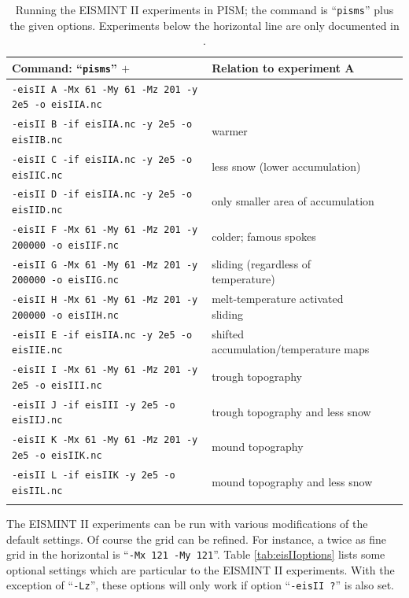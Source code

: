 \documentclass[11pt,final]{amsart}
\renewcommand{\t}[1]{\texttt{#1}}
\begin{document}
\begin{table}[ht]
\caption{Running the EISMINT II experiments in PISM; the command is ``\t{pisms}'' plus the given options.  Experiments below the horizontal line are only documented in \cite{EISIIdescribe}.}\label{tab:eisII}
\small
\begin{tabular}{@{}llll}\hline
\textbf{Command: ``\t{pisms}'' $+$} & \textbf{Relation to experiment A} \\ \hline
\verb|-eisII A -Mx 61 -My 61 -Mz 201 -y 2e5 -o eisIIA.nc| & \\
\verb|-eisII B -if eisIIA.nc -y 2e5 -o eisIIB.nc| & warmer \\
\verb|-eisII C -if eisIIA.nc -y 2e5 -o eisIIC.nc| & less snow (lower accumulation)\\
\verb|-eisII D -if eisIIA.nc -y 2e5 -o eisIID.nc| & only smaller area of accumulation \\
\verb|-eisII F -Mx 61 -My 61 -Mz 201 -y 200000 -o eisIIF.nc| & colder; famous spokes \cite{BBL} \\
\verb|-eisII G -Mx 61 -My 61 -Mz 201 -y 200000 -o eisIIG.nc| & sliding (regardless of temperature) \\
\verb|-eisII H -Mx 61 -My 61 -Mz 201 -y 200000 -o eisIIH.nc| & melt-temperature activated sliding \\ \hline
\verb|-eisII E -if eisIIA.nc -y 2e5 -o eisIIE.nc| & shifted accumulation/temperature maps \\
\verb|-eisII I -Mx 61 -My 61 -Mz 201 -y 2e5 -o eisIII.nc| & trough topography \\
\verb|-eisII J -if eisIII -y 2e5 -o eisIIJ.nc| & trough topography and less snow \\
\verb|-eisII K -Mx 61 -My 61 -Mz 201 -y 2e5 -o eisIIK.nc| & mound topography \\
\verb|-eisII L -if eisIIK -y 2e5 -o eisIIL.nc| & mound topography and less snow \\
\hline\normalsize
\end{tabular}\end{table}

The EISMINT II experiments can be run with various modifications of the default settings.  Of course the grid can be refined.  For instance, a twice as fine grid in the horizontal is ``\t{-Mx 121 -My 121}''.  Table \ref{tab:eisIIoptions} lists some optional settings which are particular to the EISMINT II experiments.  With the exception of ``\verb|-Lz|'', these options will only work if option ``\t{-eisII ?}'' is also set.
\end{document}
